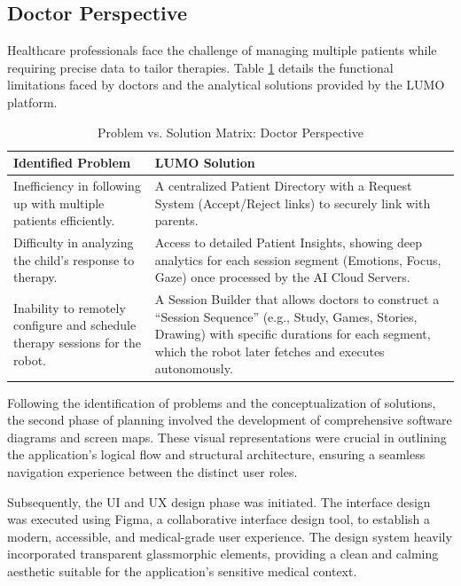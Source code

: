 \documentclass[12pt,a4paper]{report}
\begin{document}
\newpage
\subsection{Doctor Perspective}

Healthcare professionals face the challenge of managing multiple patients while requiring precise data to tailor therapies. Table \ref{tab:doctor_perspective} details the functional limitations faced by doctors and the analytical solutions provided by the LUMO platform.

\begin{table}[H]
    \centering
    \renewcommand{\arraystretch}{1.5}
    \caption{Problem vs. Solution Matrix: Doctor Perspective}
    \label{tab:doctor_perspective}
    \begin{tabular}{|p{}|p{}|}
        \hline
        \textbf{Identified Problem} & \textbf{LUMO Solution} \\
        \hline
        Inefficiency in following up with multiple patients efficiently. & A centralized Patient Directory with a Request System (Accept/Reject links) to securely link with parents. \\
        \hline
        Difficulty in analyzing the child's response to therapy. & Access to detailed Patient Insights, showing deep analytics for each session segment (Emotions, Focus, Gaze) once processed by the AI Cloud Servers. \\
        \hline
        Inability to remotely configure and schedule therapy sessions for the robot. & A Session Builder that allows doctors to construct a ``Session Sequence'' (e.g., Study, Games, Stories, Drawing) with specific durations for each segment, which the robot later fetches and executes autonomously. \\
        \hline
    \end{tabular}
\end{table}

Following the identification of problems and the conceptualization of solutions, the second phase of planning involved the development of comprehensive software diagrams and screen maps. These visual representations were crucial in outlining the application's logical flow and structural architecture, ensuring a seamless navigation experience between the distinct user roles.

Subsequently, the UI and UX design phase was initiated. The interface design was executed using Figma, a collaborative interface design tool, to establish a modern, accessible, and medical-grade user experience. The design system heavily incorporated transparent glassmorphic elements, providing a clean and calming aesthetic suitable for the application's sensitive medical context.
\end{document}
